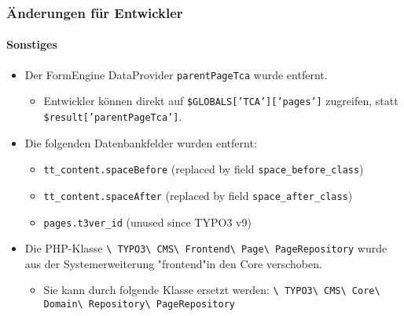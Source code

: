 \begin{frame}[fragile]
	\frametitle{Änderungen für Entwickler}
	\framesubtitle{Sonstiges}

	\begin{itemize}
		\item Der FormEngine DataProvider \texttt{parentPageTca} wurde entfernt.

			\begin{itemize}\smaller
				\item[\ding{228}] Entwickler können direkt auf \texttt{\$GLOBALS['TCA']['pages']} zugreifen, statt \texttt{\$result['parentPageTca']}.
			\end{itemize}\normalsize

		\item Die folgenden Datenbankfelder wurden entfernt:

			\begin{itemize}\smaller
				\item \texttt{tt\_content.spaceBefore} (replaced by field \texttt{space\_before\_class})
				\item \texttt{tt\_content.spaceAfter} (replaced by field \texttt{space\_after\_class})
				\item \texttt{pages.t3ver\_id} (unused since TYPO3 v9)
			\end{itemize}\normalsize

		\item Die PHP-Klasse
			\texttt{\textbackslash
				TYPO3\textbackslash
				CMS\textbackslash
				Frontend\textbackslash
				Page\textbackslash
				PageRepository} wurde aus der Systemerweiterung "frontend"in den Core verschoben.

			\begin{itemize}\smaller
				\item Sie kann durch folgende Klasse ersetzt werden:
					\texttt{\textbackslash
						TYPO3\textbackslash
						CMS\textbackslash
						Core\textbackslash
						Domain\textbackslash
						Repository\textbackslash
						PageRepository}
			\end{itemize}\normalsize

	\end{itemize}

\end{frame}


